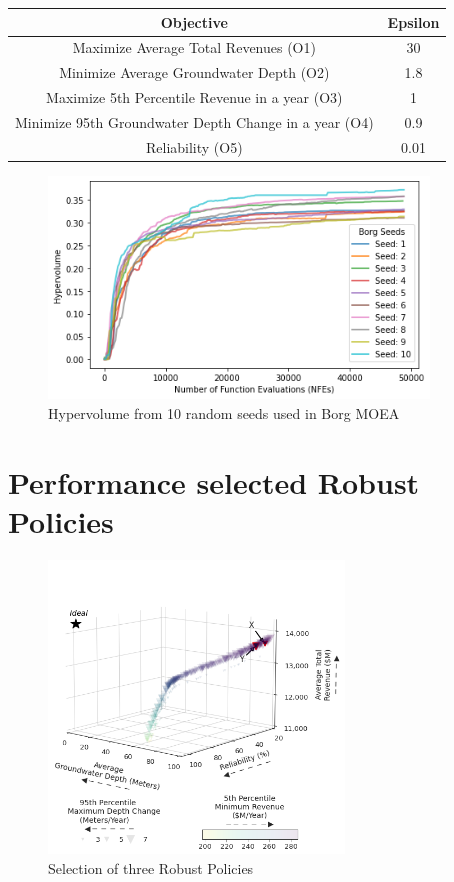 \documentclass[11pt,a4paper]{article}
\begin{document}
\begin{center}
\begin{tabular}{ |c|c| }
 \hline
 Objective & Epsilon \\ 
 \hline
Maximize Average Total Revenues (O1) & 30  \\
Minimize Average Groundwater Depth (O2) & 1.8 \\
Maximize 5th Percentile Revenue in a year (O3) & 1 \\
Minimize 95th Groundwater Depth Change in a year (O4) & 0.9 \\
Reliability (O5) & 0.01 \\
\hline
\end{tabular}
\end{center}

\begin{figure}[H]
    \centering
    \includegraphics[width=0.9\textwidth]{Borg_Seeds_Hypervolume.png}
    \caption{Hypervolume from 10 random seeds used in Borg MOEA}
    \label{fig:m1esh1}
\end{figure}

\section{Performance selected Robust Policies}

\begin{figure}[H]
    \centering
    \includegraphics[width=0.7\textwidth]{3d_selected_robust.png}
    \caption{Selection of three Robust Policies}
    \label{fig:m1esh1}
\end{figure}
\end{document}
